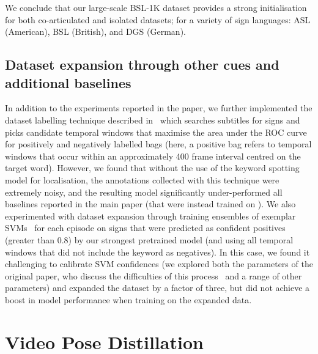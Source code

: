 We conclude that our large-scale BSL-1K dataset provides a strong initialisation
for both co-articulated and isolated datasets; for a variety of sign languages: ASL (American),
BSL (British), and DGS (German).

\subsection{Dataset expansion through other cues and additional baselines} \label{app:subsec:othercues}

In addition to the experiments reported in the paper, we further implemented the dataset labelling technique described in~\cite{pfister2013large} which searches subtitles for signs and picks candidate temporal windows that maximise the area under the ROC curve for positively and negatively labelled bags (here, a positive bag refers to temporal windows that occur within an approximately 400 frame interval centred on the target word).   However, we found that without the use of the keyword spotting model for localisation, the annotations collected with this technique were extremely noisy, and the resulting model significantly under-performed all baselines reported in the main paper (that were instead trained on \datasetName).  We also experimented with dataset expansion through training ensembles of exemplar SVMs~\cite{malisiewicz2011ensemble} for each episode on signs that were predicted as confident positives (greater than 0.8) by our strongest pretrained model (and using all temporal windows that did not include the keyword as negatives).  In this case, we found it challenging to calibrate SVM confidences (we explored both the parameters of the original paper, who discuss the difficulties of this process~\cite{malisiewicz2011ensemble} and a range of other parameters) and expanded the dataset by a factor of three, but did not achieve a boost in model performance when training on the expanded data.  


\section{Video Pose Distillation} \label{app:sec:posedistillation}


